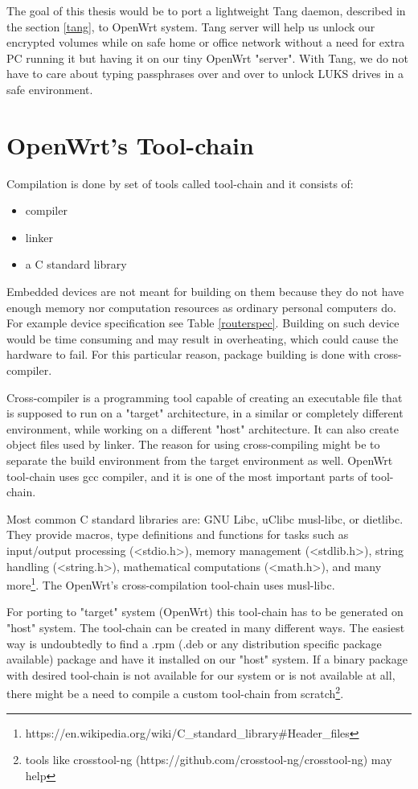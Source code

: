 The goal of this thesis would be to port a lightweight Tang daemon, described in the section \ref{tang}, to OpenWrt system.
Tang server will help us unlock our encrypted volumes while on safe home or office network without a need for extra PC running it but having it on our tiny OpenWrt "server".
With Tang, we do not have to care about typing passphrases over and over to unlock LUKS drives in a safe environment.



\section{OpenWrt's Tool-chain}

Compilation is done by set of tools called tool-chain and it consists of:
\begin{itemize}
    \item compiler
    \item linker
    \item a C standard library
\end{itemize}

Embedded devices are not meant for building on them because they do not have enough memory nor computation resources as ordinary personal computers do.
For example device specification see Table \ref{routerspec}.
Building on such device would be time consuming and may result in overheating, which could cause the hardware to fail.
For this particular reason, package building is done with cross-compiler.

Cross-compiler is a programming tool capable of creating an executable file that is supposed to run on a "target" architecture, in a similar or completely different environment, while working on a different "host" architecture.
It can also create object files used by linker.
The reason for using cross-compiling might be to separate the build environment from the target environment as well.
OpenWrt tool-chain uses gcc compiler, and it is one of the most important parts of tool-chain.

Most common C standard libraries are: GNU Libc, uClibc musl-libc, or dietlibc.
They provide macros, type definitions and functions for tasks such as input/output processing (<stdio.h>), memory management (<stdlib.h>), string handling (<string.h>), mathematical computations (<math.h>), and many more\footnote{https://en.wikipedia.org/wiki/C\_standard\_library\#Header\_files}.
The OpenWrt's cross-compilation tool-chain uses musl-libc.

For porting to "target" system (OpenWrt) this tool-chain has to be generated on "host" system.
The tool-chain can be created in many different ways.
The easiest way is undoubtedly to find a .rpm (.deb or any distribution specific package available) package and have it installed on our "host" system.
If a binary package with desired tool-chain is not available for our system or is not available at all, there might be a need to compile a custom tool-chain from scratch\footnote{tools like crosstool-ng (https://github.com/crosstool-ng/crosstool-ng) may help}.

